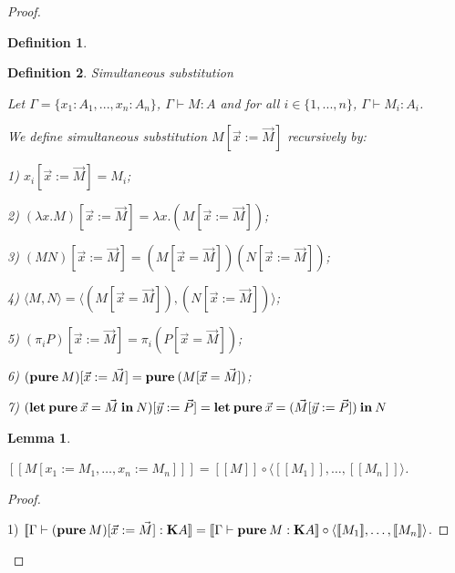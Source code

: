 \documentclass[a4paper]{article}
\newtheorem{lemma}{Lemma}
\newtheorem{defin}{Definition}
\begin{document}
\begin{proof}
\begin{defin}
\end{defin}

\begin{defin} Simultaneous substitution

Let $\Gamma = \{ x_1 : A_1, ..., x_n : A_n \}$, $\Gamma \vdash M : A$ and for all $i \in \{ 1,..., n \}$,
$\Gamma \vdash M_i : A_i$.

We define simultaneous substitution $M [ \vec{x} := \vec{M}]$ recursively by:

1) $x_i [ \vec{x} := \vec{M}] = M_i $;

2) $(\lambda x. M) [ \vec{x} := \vec{M}] = \lambda x. (M [ \vec{x} := \vec{M}])$;

3) $(M N) [ \vec{x} := \vec{M}] = (M [ \vec{x} = \vec{M}]) (N [ \vec{x} := \vec{M}])$;

4) $\langle M, N \rangle = \langle (M [ \vec{x} = \vec{M}]), (N [ \vec{x} := \vec{M}])\rangle$;

5) $(\pi_i P) [ \vec{x} := \vec{M}] = \pi_i (P [ \vec{x} = \vec{M}])$;

6) $({\bf pure \:} M) [ \vec{x} := \vec{M}] = {\bf pure \:} (M [ \vec{x} = \vec{M}])$;

7) $({\bf let \: pure} \: \vec{x} = \vec{M} {\: \bf in \:} N) [\vec{y} := \vec{P}] =
{\bf let \: pure} \: \vec{x} = (\vec{M} [\vec{y} := \vec{P}]) {\: \bf in \:} N$

\end{defin}

\begin{lemma}
$ $

$[\![M [x_1 := M_1,\dots, x_n := M_n]]\!] = [\![M]\!] \circ \langle [\![M_1]\!], \dots, [\![M_n]\!] \rangle$.

\end{lemma}

\begin{proof}

$ $

1) $[\![\Gamma \vdash ({\bf pure \:} M) [ \vec{x} := \vec{M}] : {\bf K}A ]\!] = [\![ \Gamma \vdash {\bf pure \:} M : {\bf K}A]\!] \circ \langle [\![M_1]\!], \dots,
[\![M_n]\!] \rangle$.

\vspace{\baselineskip}


\end{proof}
\end{proof}
\end{document}
